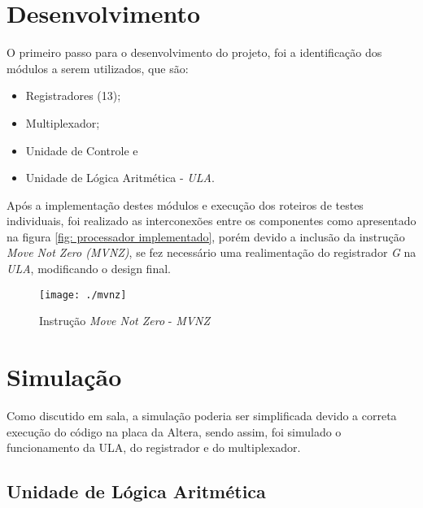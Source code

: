 \documentclass[12pt, a4paper]{article}
\begin{document}
    \section{Desenvolvimento}
    
	\par O primeiro passo para o desenvolvimento do projeto, foi a identificação dos módulos a serem utilizados, que são:

	\vspace{\baselineskip}

	\begin{itemize}
		\item Registradores (13);
		\item Multiplexador;
		\item Unidade de Controle e
		\item Unidade de Lógica Aritmética - \textit{ULA}.
	\end{itemize}
	
	\vspace{\baselineskip}
	
	\par Após a implementação destes módulos e execução dos roteiros de testes individuais, foi realizado as interconexões entre os componentes como apresentado na figura \ref{fig: processador implementado}, porém devido a inclusão da instrução \textit{Move Not Zero (MVNZ)}, se fez necessário uma realimentação do registrador \textit{G} na \textit{ULA}, modificando o design final.
	
	\begin{figure}[t]
		\centering
		\texttt{[image: ./mvnz]}
		\caption{Instrução \textit{Move Not Zero} - \textit{MVNZ}}
		\label{fig: Move Not Zero}
	\end{figure}
    
	\section{Simulação}
	
	\par Como discutido em sala, a simulação poderia ser simplificada devido a correta execução do código na placa da Altera, sendo assim, foi simulado o funcionamento da ULA, do registrador e do multiplexador.
	
	\subsection{Unidade de Lógica Aritmética}
	
\end{document}
